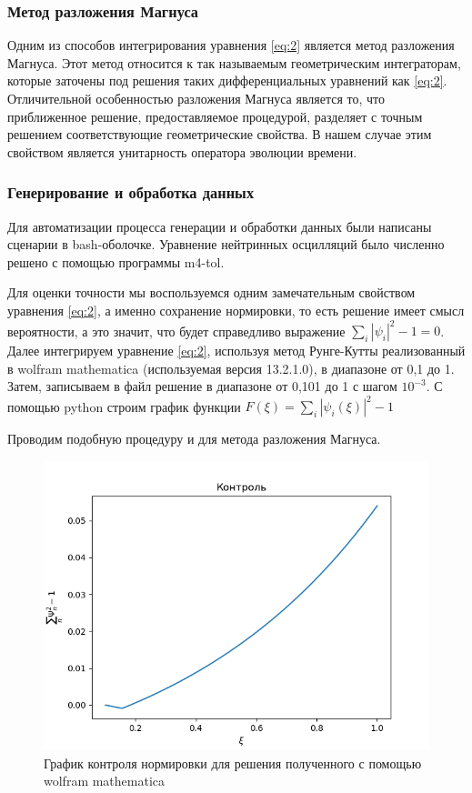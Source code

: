\documentclass[utf8,9pt,mathserif,usepdftitle=false]{beamer}
\begin{document}
\begin{frame}
	\frametitle{Метод разложения Магнуса}%
	Одним из способов интегрирования уравнения \eqref{eq:2} является метод
  разложения Магнуса. Этот метод относится к так называемым геометрическим
  интеграторам, которые заточены под решения таких дифференциальных уравнений
  как \eqref{eq:2}. Отличительной особенностью разложения Магнуса является то,
  что приближенное решение, предоставляемое процедурой, разделяет с точным
  решением соответствующие геометрические свойства. В нашем случае этим
  свойством является унитарность оператора эволюции времени.
\end{frame}

\begin{frame}
	\frametitle{Генерирование и обработка данных}%
  Для автоматизации процесса генерации и обработки данных были написаны сценарии
  в bash-оболочке. Уравнение нейтринных осцилляций было численно решено с
  помощью программы m4-tol.
	
	Для оценки точности мы воспользуемся одним замечательным свойством уравнения
  \eqref{eq:2}, а именно сохранение нормировки, то есть решение имеет смысл
  вероятности, а это значит, что будет справедливо выражение
  \(\sum_{i}|\psi_{i}|^{2}-1=0\). Далее интегрируем уравнение \eqref{eq:2},
  используя метод Рунге-Кутты реализованный в wolfram mathematica (используемая
  версия 13.2.1.0), в диапазоне от 0,1 до 1. Затем, записываем в файл решение в
  диапазоне от 0,101 до 1 с шагом \(10^{-3}\). С помощью python строим график
  функции \(F(\xi)=\sum_{i}|\psi_{i}(\xi)|^{2}-1\)
	
	Проводим подобную процедуру и для метода разложения Магнуса.
\end{frame}

\begin{frame}
  \begin{figure}[h]
		\centering	
		\includegraphics[width=0.8\linewidth]{контроль_м}
		\caption{График контроля нормировки для решения полученного с помощью wolfram mathematica}
	\end{figure}
\end{frame}
\end{document}

